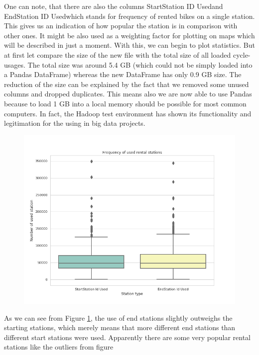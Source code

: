 One can note, that there are also the columns \glqq StartStation ID Used\grqq and \glqq EndStation ID Used\grqq which stands for frequency of rented bikes on a single station. This gives us an indication of how
popular the station is in comparison with other ones. It might be also used as a weighting factor
for plotting on maps which will be described in just a moment.
With this, we can begin to plot statistics. But at first let compare the size of the new file with the
total size of all loaded cycle-usages. The total size was around 5.4 GB (which could not be simply
loaded into a Pandas DataFrame) whereas the new DataFrame has only 0.9 GB size. The reduction
of the size can be explained by the fact that we removed some unused columns and dropped
duplicates. This means also we are now able to use Pandas because to load 1 GB into a local
memory should be possible for most common computers. In fact, the Hadoop test environment
has shown its functionality and legitimation for the using in big data projects.
\begin{figure}[H]
\hspace{-0.8cm}
\includegraphics[width=1.1\textwidth]{img/plot1}
\label{pic:plot1}
\end{figure}
\noindent As we can see from Figure \ref{pic:plot1}, the use of end stations slightly outweighs the starting stations,
which merely means that more different end stations than different start stations
were used. Apparently there are some very popular rental stations like the outliers from figure
